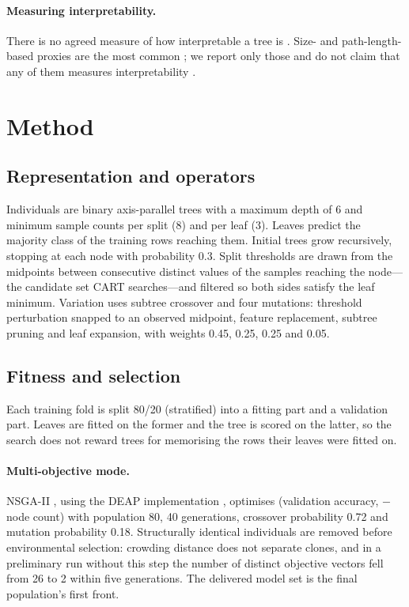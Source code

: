 \documentclass[11pt]{article}
\begin{document}
\paragraph{Measuring interpretability.} There is no agreed measure of how interpretable a
tree is \citep{lipton2018,doshivelez2017}. Size- and path-length-based proxies are the most
common \citep{freitas2014,piltaver2016}; we report only those and do not claim that any of
them measures interpretability \citep{rudin2019}.

\section{Method}
\label{sec:method}

\subsection{Representation and operators}
Individuals are binary axis-parallel trees with a maximum depth of 6 and minimum sample
counts per split (8) and per leaf (3). Leaves predict the majority class of the training
rows reaching them. Initial trees grow recursively, stopping at each node with
probability 0.3. Split thresholds are drawn from the midpoints between consecutive
distinct values of the samples reaching the node---the candidate set CART searches---and
filtered so both sides satisfy the leaf minimum. Variation uses subtree crossover and four
mutations: threshold perturbation snapped to an observed midpoint, feature replacement,
subtree pruning and leaf expansion, with weights 0.45, 0.25, 0.25 and 0.05.

\subsection{Fitness and selection}
Each training fold is split 80/20 (stratified) into a fitting part and a validation part.
Leaves are fitted on the former and the tree is scored on the latter, so the search does
not reward trees for memorising the rows their leaves were fitted on.

\paragraph{Multi-objective mode.} NSGA-II \citep{deb2002}, using the DEAP implementation
\citep{fortin2012}, optimises (validation accuracy, $-$node count) with population 80,
40 generations, crossover probability 0.72 and mutation probability 0.18. Structurally
identical individuals are removed before environmental selection: crowding distance does
not separate clones, and in a preliminary run without this step the number of distinct
objective vectors fell from 26 to 2 within five generations. The delivered model set is
the final population's first front.
\end{document}
